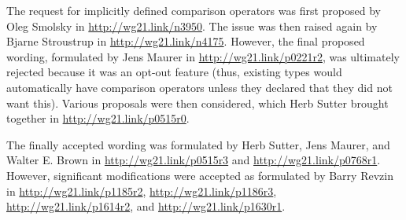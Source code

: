 The request for implicitly defined comparison operators was first proposed by Oleg Smolsky in \url{http://wg21.link/n3950}. The issue was then raised again by Bjarne Stroustrup in \url{http://wg21.link/n4175}. However, the final proposed wording, formulated by Jens Maurer in \url{http://wg21.link/p0221r2}, was ultimately rejected because it was an opt-out feature (thus, existing types would automatically have comparison operators unless they declared that they did not want this). Various proposals were then considered, which Herb Sutter brought together in \url{http://wg21.link/p0515r0}.

The finally accepted wording was formulated by Herb Sutter, Jens Maurer, and Walter E. Brown in \url{http://wg21.link/p0515r3} and \url{http://wg21.link/p0768r1}. However, significant modifications were accepted as formulated by Barry Revzin in \url{http://wg21.link/p1185r2}, \url{http://wg21.link/p1186r3}, \url{http://wg21.link/p1614r2}, and \url{http://wg21.link/p1630r1}.